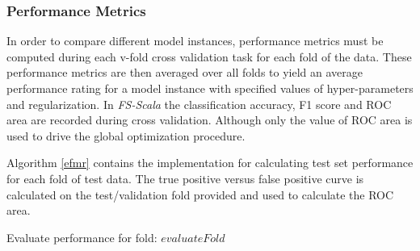 \subsubsection*{Performance Metrics}
In order to compare different model instances, performance metrics must be computed during each v-fold cross validation task for each fold of the data. These performance metrics are then averaged over all folds to yield an average performance rating for a model instance with specified values of hyper-parameters and regularization. In \emph{FS-Scala} the classification accuracy, F1 score and ROC area are recorded during cross validation. Although only the value of ROC area is used to drive the global optimization procedure.

Algorithm \ref{efmr} contains the implementation for calculating test set performance for each fold of test data. The true positive versus false positive curve is calculated on the test/validation fold provided and used to calculate the ROC area.

\begin{algorithm}[!htbp]\label{efmr}
    \DontPrintSemicolon
\caption{Evaluate performance for fold: $evaluateFold$}
\end{algorithm}
